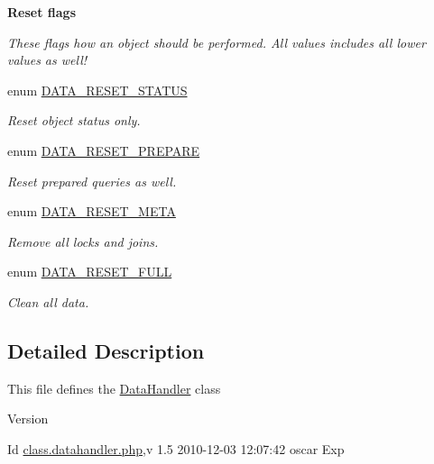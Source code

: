\begin{Indent}{\bf Reset flags}\par
{\em \label{_amgrp143448a659afeaa8616ca6e3acdb751b}
 These flags how an object should be performed. All values includes all lower values as well! }\begin{DoxyCompactItemize}
\item 
enum \hyperlink{class_8datahandler_8php_a9266811d651cb3ff8c5fdf00111e677b}{DATA\_\-RESET\_\-STATUS} 
\begin{DoxyCompactList}\small\item\em Reset object status only. \item\end{DoxyCompactList}\item 
enum \hyperlink{class_8datahandler_8php_a19a99423705b41e563424ae76d7fe184}{DATA\_\-RESET\_\-PREPARE} 
\begin{DoxyCompactList}\small\item\em Reset prepared queries as well. \item\end{DoxyCompactList}\item 
enum \hyperlink{class_8datahandler_8php_a3ce9f928f9ba75096925bd4157246bbb}{DATA\_\-RESET\_\-META} 
\begin{DoxyCompactList}\small\item\em Remove all locks and joins. \item\end{DoxyCompactList}\item 
enum \hyperlink{class_8datahandler_8php_a2a28429433990da242faa223d5a49f0a}{DATA\_\-RESET\_\-FULL} 
\begin{DoxyCompactList}\small\item\em Clean all data. \item\end{DoxyCompactList}\end{DoxyCompactItemize}
\end{Indent}


\subsection{Detailed Description}
This file defines the \hyperlink{classDataHandler}{DataHandler} class \begin{DoxyVersion}{Version}

\end{DoxyVersion}
\begin{DoxyParagraph}{Id}
\hyperlink{class_8datahandler_8php}{class.datahandler.php},v 1.5 2010-\/12-\/03 12:07:42 oscar Exp 
\end{DoxyParagraph}



